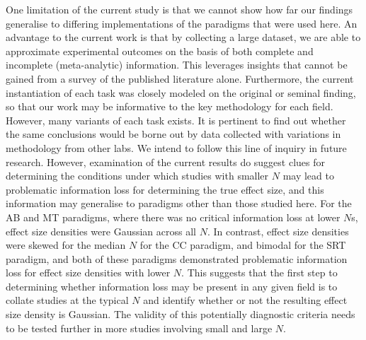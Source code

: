 \documentclass{article}
\begin{document}
One limitation of the current study is that we cannot show how far our findings generalise to differing implementations of the paradigms that were used here. An advantage to the current work is that by collecting a large dataset, we are able to approximate experimental outcomes on the basis of both complete and incomplete (meta-analytic) information. This leverages insights that cannot be gained from a survey of the published literature alone. Furthermore, the current instantiation of each task was closely modeled on the original or seminal finding, so that our work may be informative to the key methodology for each field. However, many variants of each task exists. It is pertinent to find out whether the same conclusions would be borne out by data collected with variations in methodology from other labs. We intend to follow this line of inquiry in future research. However, examination of the current results do suggest clues for determining the conditions under which studies with smaller \(N\) may lead to problematic information loss for determining the true effect size, and this information may generalise to paradigms other than those studied here. For the AB and MT paradigms, where there was no critical information loss at lower \(N\)s, effect size densities were Gaussian across all \(N\). In contrast, effect size densities were skewed for the median \(N\) for the CC paradigm, and bimodal for the SRT paradigm, and both of these paradigms demonstrated problematic information loss for effect size densities with lower \(N\). This suggests that the first step to determining whether information loss may be present in any given field is to collate studies at the typical \(N\) and identify whether or not the resulting effect size density is Gaussian. The validity of this potentially diagnostic criteria needs to be tested further in more studies involving small and large \(N\).
\end{document}
